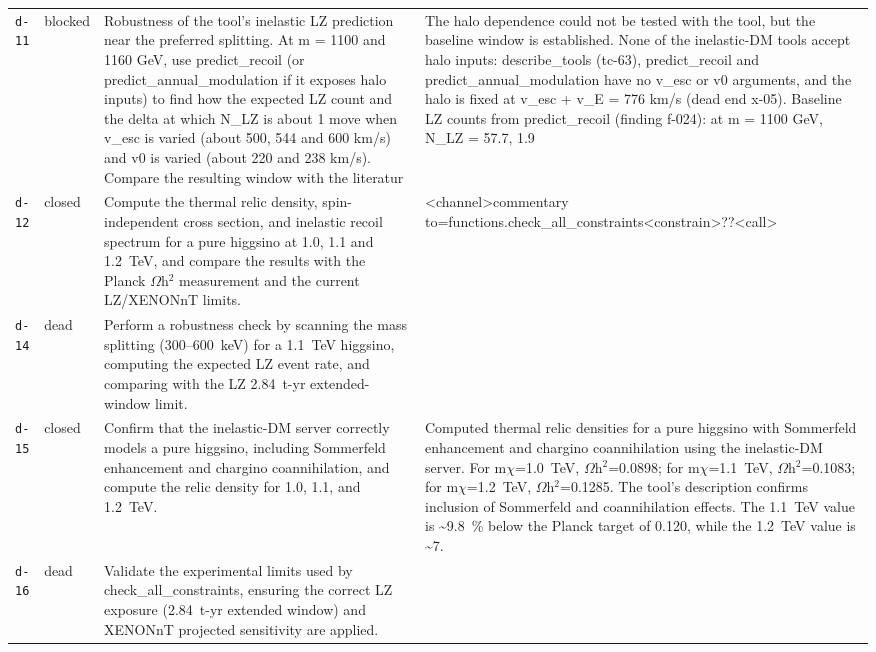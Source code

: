 \documentclass[11pt,a4paper]{article}
\begin{document}
\begin{longtable}{@{}p{}p{}p{}p{}@{}}
\texttt{d-11} & blocked & Robustness of the tool's inelastic LZ prediction near the preferred splitting. At m = 1100 and 1160 GeV, use predict\_recoil (or predict\_annual\_modulation if it exposes halo inputs) to find how the expected LZ count and the delta at which N\_LZ is about 1 move when v\_esc is varied (about 500, 544 and 600 km/s) and v0 is varied (about 220 and 238 km/s). Compare the resulting window with the literatur & The halo dependence could not be tested with the tool, but the baseline window is established. None of the inelastic-DM tools accept halo inputs: describe\_tools (tc-63), predict\_recoil and predict\_annual\_modulation have no v\_esc or v0 arguments, and the halo is fixed at v\_esc + v\_E = 776 km/s (dead end x-05). Baseline LZ counts from predict\_recoil (finding f-024): at m = 1100 GeV, N\_LZ = 57.7, 1.9 \\
\texttt{d-12} & closed & Compute the thermal relic density, spin-independent cross section, and inelastic recoil spectrum for a pure higgsino at 1.0, 1.1 and 1.2~TeV, and compare the results with the Planck $\Omega$h$^2$ measurement and the current LZ/XENONnT limits. & \textless{}\textbar{}channel\textbar{}\textgreater{}commentary to=functions.check\_all\_constraints\textless{}\textbar{}constrain\textbar{}\textgreater{}??\textless{}\textbar{}call\textbar{}\textgreater{} \\
\texttt{d-14} & dead & Perform a robustness check by scanning the mass splitting (300--600~keV) for a 1.1~TeV higgsino, computing the expected LZ event rate, and comparing with the LZ 2.84~t-yr extended-window limit. &  \\
\texttt{d-15} & closed & Confirm that the inelastic-DM server correctly models a pure higgsino, including Sommerfeld enhancement and chargino coannihilation, and compute the relic density for 1.0, 1.1, and 1.2~TeV. & Computed thermal relic densities for a pure higgsino with Sommerfeld enhancement and chargino coannihilation using the inelastic-DM server. For m$\chi$=1.0~TeV, $\Omega$h$^2$=0.0898; for m$\chi$=1.1~TeV, $\Omega$h$^2$=0.1083; for m$\chi$=1.2~TeV, $\Omega$h$^2$=0.1285. The tool's description confirms inclusion of Sommerfeld and coannihilation effects. The 1.1~TeV value is \textasciitilde{}9.8~\% below the Planck target of 0.120, while the 1.2~TeV value is \textasciitilde{}7. \\
\texttt{d-16} & dead & Validate the experimental limits used by check\_all\_constraints, ensuring the correct LZ exposure (2.84~t-yr extended window) and XENONnT projected sensitivity are applied. &  \\

\end{longtable}
\end{document}
